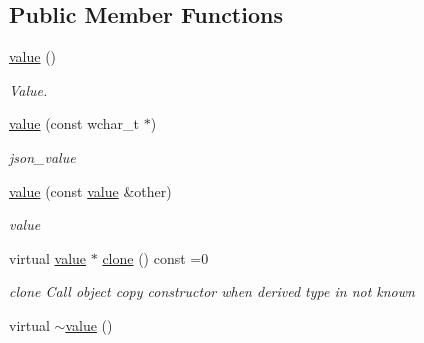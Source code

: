 \subsection*{Public Member Functions}
\begin{DoxyCompactItemize}
\item 
\hyperlink{classformat_1_1value_aa6b85823936bf7b8ab78d3f8d443c00d}{value} ()\hypertarget{classformat_1_1value_aa6b85823936bf7b8ab78d3f8d443c00d}{}\label{classformat_1_1value_aa6b85823936bf7b8ab78d3f8d443c00d}

\begin{DoxyCompactList}\small\item\em Value. \end{DoxyCompactList}\item 
\hyperlink{classformat_1_1value_a3c21663a87408a066b93bc41a099f1d8}{value} (const wchar\+\_\+t $\ast$)
\begin{DoxyCompactList}\small\item\em json\+\_\+value \end{DoxyCompactList}\item 
\hyperlink{classformat_1_1value_a6519ed65370e658a185a0a0db0152554}{value} (const \hyperlink{classformat_1_1value}{value} \&other)
\begin{DoxyCompactList}\small\item\em value \end{DoxyCompactList}\item 
virtual \hyperlink{classformat_1_1value}{value} $\ast$ \hyperlink{classformat_1_1value_a8756eb79e41851859d83ae46069dc400}{clone} () const =0
\begin{DoxyCompactList}\small\item\em clone Call object copy constructor when derived type in not known \end{DoxyCompactList}\item 
virtual \hyperlink{classformat_1_1value_a909766075c9375317ef5e842741f666d}{$\sim$value} ()\hypertarget{classformat_1_1value_a909766075c9375317ef5e842741f666d}{}\label{classformat_1_1value_a909766075c9375317ef5e842741f666d}


\end{DoxyCompactItemize}
